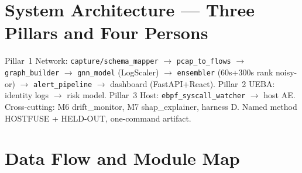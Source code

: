 \documentclass[12pt,a4paper,oneside]{report}
\begin{document}
\section{System Architecture — Three Pillars and Four Persons}
Pillar~1 Network: \texttt{capture/schema\_mapper} $\rightarrow$ \texttt{pcap\_to\_flows} $\rightarrow$ \texttt{graph\_builder} $\rightarrow$ \texttt{gnn\_model} (LogScaler) $\rightarrow$ \texttt{ensembler} (60s+300s rank noisy-or) $\rightarrow$ \texttt{alert\_pipeline} $\rightarrow$ dashboard (FastAPI+React). Pillar~2 UEBA: identity logs $\rightarrow$ risk model. Pillar~3 Host: \texttt{ebpf\_syscall\_watcher} $\rightarrow$ host AE. Cross-cutting: M6 drift\_monitor, M7 shap\_explainer, harness D. Named method HOSTFUSE + HELD-OUT, one-command artifact.

\section{Data Flow and Module Map}
\end{document}
